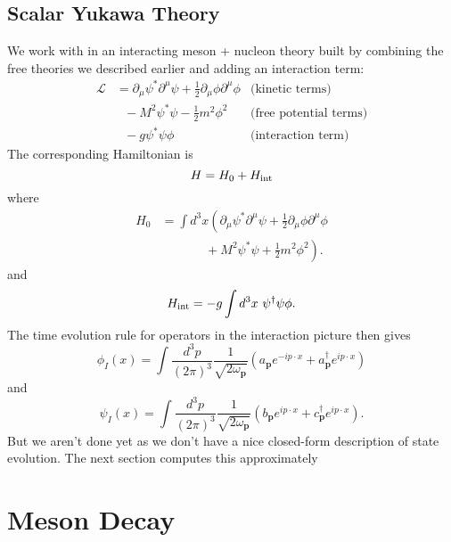 \documentclass[12 pt]{article}
\newcommand{\B}[1]{\mathbf{#1}}
\newcommand{\LA}{\mathcal{L}}
\newcommand{\LP}{\left(}
\newcommand{\RP}{\right)}
\newcommand{\D}{\partial}
\numberwithin{equation}{section}
\begin{document}
\subsection{Scalar Yukawa Theory}

We work with in an interacting meson + nucleon theory built by combining the free theories we described earlier and adding an interaction term: \begin{align*}
\LA & = \D_\mu  \psi^* \D^\mu  \psi + \frac{1}{2} \D_\mu \phi \D^\mu \phi & \mbox{(kinetic terms)}\\
\ & \ \ \ - M^2 \psi^* \psi - \frac{1}{2} m^2 \phi^2 & \mbox{(free potential terms)} \\
\ & \ \ \ - g \psi^* \psi \phi & \mbox{(interaction term)}
\end{align*}
The corresponding Hamiltonian is \begin{equation*}
H = H_0 + H_{\mbox{\scriptsize{int}}}
\end{equation*}
where
\begin{align*}
H_0 & = \int d^3x \LP \D_\mu  \psi^* \D^\mu  \psi + \frac{1}{2} \D_\mu \phi \D^\mu \phi \right.\\
\ & \ \ \ \ \ \ \ \ \ \ \ \ \ \ \ \ + \left. M^2 \psi^* \psi + \frac{1}{2} m^2 \phi^2 \RP.
\end{align*}
and
\begin{equation*}
H_{\mbox{\scriptsize{int}}} = -g \int d^3 x \ \psi^\dagger \psi \phi.
\end{equation*}
The time evolution rule for operators in the interaction picture then gives \begin{equation*}
\phi_I (x) =  \int \frac{d^3 p}{(2 \pi)^3} \frac{1}{\sqrt{2 \omega_\B{p}}} \LP a_{\B{p}} e^{- i p \cdot x} + a^\dagger_{\B{p}} e^{i p \cdot x} \RP
\end{equation*}
and
\begin{equation*}
\psi_I (x) =  \int \frac{d^3 p}{(2 \pi)^3} \frac{1}{\sqrt{2 \omega_\B{p}}} \LP b_{\B{p}} e^{ i p \cdot x} + c^\dagger_{\B{p}} e^{i p \cdot x} \RP.
\end{equation*}
But we aren't done yet as we don't have a nice closed-form description of state evolution. The next section computes this approximately 



\section{Meson Decay}
\end{document}
